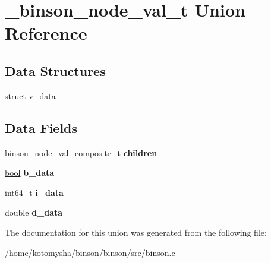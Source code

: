 \hypertarget{union__binson__node__val__t}{\section{\-\_\-binson\-\_\-node\-\_\-val\-\_\-t Union Reference}
\label{union__binson__node__val__t}
}
\subsection*{Data Structures}
\begin{DoxyCompactItemize}
\item 
struct \hyperlink{struct__binson__node__val__t_1_1v__data}{v\-\_\-data}
\end{DoxyCompactItemize}
\subsection*{Data Fields}
\begin{DoxyCompactItemize}
\item 
\hypertarget{union__binson__node__val__t_af889286076474cb75c1e914414dff4bc}{binson\-\_\-node\-\_\-val\-\_\-composite\-\_\-t {\bfseries children}}\label{union__binson__node__val__t_af889286076474cb75c1e914414dff4bc}

\item 
\hypertarget{union__binson__node__val__t_a15c6a5fe960caf0b80848064a6b0d5ce}{\hyperlink{binson__config_8h_abb452686968e48b67397da5f97445f5b}{bool} {\bfseries b\-\_\-data}}\label{union__binson__node__val__t_a15c6a5fe960caf0b80848064a6b0d5ce}

\item 
\hypertarget{union__binson__node__val__t_a51d190f78e0d37053cda4ff0cf20aa49}{int64\-\_\-t {\bfseries i\-\_\-data}}\label{union__binson__node__val__t_a51d190f78e0d37053cda4ff0cf20aa49}

\item 
\hypertarget{union__binson__node__val__t_aa82f877285b2bd095def485a08daa03f}{double {\bfseries d\-\_\-data}}\label{union__binson__node__val__t_aa82f877285b2bd095def485a08daa03f}

\end{DoxyCompactItemize}


The documentation for this union was generated from the following file\-:\begin{DoxyCompactItemize}
\item 
/home/kotomysha/binson/binson/src/binson.\-c\end{DoxyCompactItemize}
